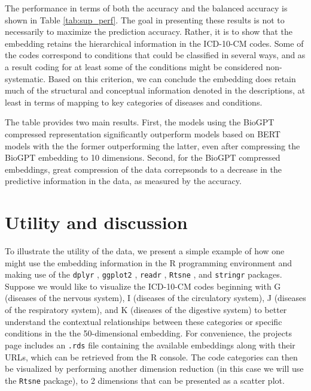 \documentclass{bmcart}
\begin{document}
The performance in terms of both the accuracy and
the balanced accuracy is shown in Table \ref{tab:sup_perf}. The goal 
in presenting these results is not to necessarily to 
maximize the prediction accuracy. Rather, it is to show that the embedding 
retains the
hierarchical information in the ICD-10-CM codes. Some of the codes correspond to
conditions that could be classified in several ways, and as a result coding
for at least some of the conditions might be considered non-systematic.
Based on this criterion, we can conclude the embedding does retain much of the 
structural and conceptual information denoted in the descriptions, at least in 
terms of mapping to key categories of diseases and conditions.


The table provides two main results. First, the models using the BioGPT 
compressed representation significantly outperform models based on BERT
models with the the former outperforming the latter, even after compressing
the BioGPT embedding to 10 dimensions. Second, for the BioGPT compressed
embeddings, great compression of the data correpsonds to a decrease in
the predictive information in the data, as measured by the accuracy.

\section*{Utility and discussion}

To illustrate the utility of the data, we present a simple example of how one 
might use the embedding information in the R programming environment and
making use of the \texttt{dplyr} \cite{dplyr}, \texttt{ggplot2} \cite{ggplot2}, 
\texttt{readr} \cite{readr}, \texttt{Rtsne} \cite{Rtsne}, and 
\texttt{stringr} \cite{stringr} packages. Suppose 
we would like to 
visualize the ICD-10-CM codes beginning with 
G (diseases of the nervous system), 
I (diseases of the circulatory system), J (diseases of the respiratory system), 
and K (diseases of the digestive system) to better understand the 
contextual relationships
between these categories or specific conditions in the the 50-dimensional 
embedding. For convenience, the projects page includes an \texttt{.rds} file
containing the available embeddings along with their URLs, which can be 
retrieved from the R console. The code categories can then be visualized 
by performing another dimension reduction (in this case we will use the
\texttt{Rtsne} package), to 2 dimensions that can be presented as a scatter plot.

\vspace{2mm}
\end{document}
